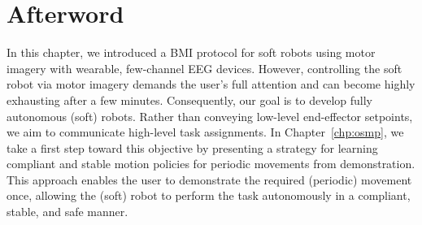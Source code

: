 \section*{Afterword}
In this chapter, we introduced a \gls{BMI} protocol for soft robots using motor imagery with wearable, few-channel \gls{EEG} devices. However, controlling the soft robot via motor imagery demands the user’s full attention and can become highly exhausting after a few minutes. Consequently, our goal is to develop fully autonomous (soft) robots. Rather than conveying low-level end-effector setpoints, we aim to communicate high-level task assignments. In Chapter~\ref{chp:osmp}, we take a first step toward this objective by presenting a strategy for learning compliant and stable motion policies for periodic movements from demonstration. This approach enables the user to demonstrate the required (periodic) movement once, allowing the (soft) robot to perform the task autonomously in a compliant, stable, and safe manner.